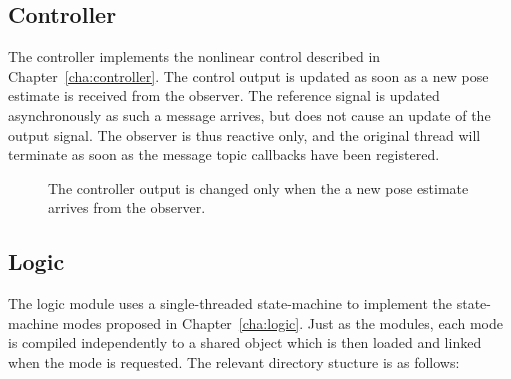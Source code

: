         \subsection{Controller}
            The controller implements the nonlinear control described in Chapter~\ref{cha:controller}.
            The control output is updated as soon as a new pose estimate is
            received from the observer. The reference signal is updated asynchronously
            as such a message arrives, but does not cause an update of the output signal.
            The observer is thus reactive only, and the original
            thread will terminate as soon as the message topic callbacks have
            been registered.
            \begin{figure}[H]
                \noindent{}
                \caption{The controller output is changed only when the a new pose estimate arrives from the observer.}
                \label{fig:crap:controller}
            \end{figure}

        \subsection{Logic}
            The logic module uses a single-threaded state-machine to implement
            the state-machine modes proposed in Chapter~\ref{cha:logic}.
            Just as the modules, each mode is compiled independently to
            a shared object which is then loaded and linked when the mode
            is requested.
            The relevant directory stucture is as follows:

